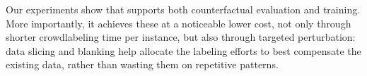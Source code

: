 Our experiments show that \sysname supports both counterfactual evaluation and training.
More importantly, it achieves these at a noticeable lower cost, not only through shorter crowdlabeling time per instance, but also through targeted perturbation: data slicing and blanking help allocate the labeling efforts to best compensate the existing data, rather than wasting them on repetitive patterns.

